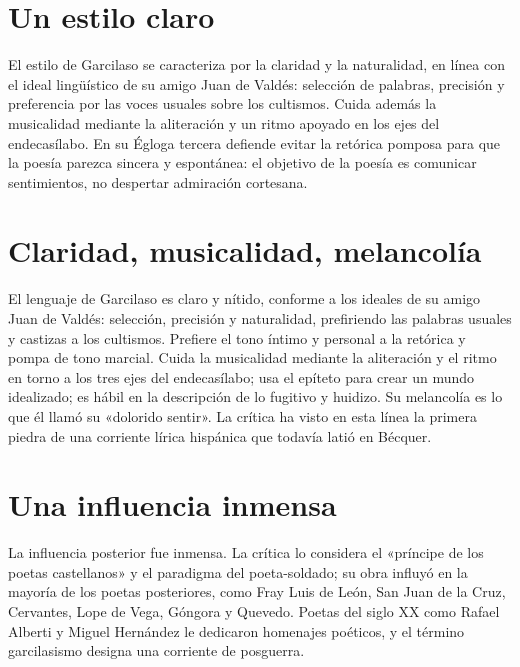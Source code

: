 \documentclass{book}
\begin{document}

\section{Un estilo claro}

El estilo de Garcilaso se caracteriza por la claridad y la naturalidad, en línea con el ideal lingüístico de su amigo Juan de Valdés: selección de palabras, precisión y preferencia por las voces usuales sobre los cultismos. Cuida además la musicalidad mediante la aliteración y un ritmo apoyado en los ejes del endecasílabo. En su Égloga tercera defiende evitar la retórica pomposa para que la poesía parezca sincera y espontánea: el objetivo de la poesía es comunicar sentimientos, no despertar admiración cortesana.


\section{Claridad, musicalidad, melancolía}

El lenguaje de Garcilaso es claro y nítido, conforme a los ideales de su amigo Juan de Valdés: selección, precisión y naturalidad, prefiriendo las palabras usuales y castizas a los cultismos. Prefiere el tono íntimo y personal a la retórica y pompa de tono marcial. Cuida la musicalidad mediante la aliteración y el ritmo en torno a los tres ejes del endecasílabo; usa el epíteto para crear un mundo idealizado; es hábil en la descripción de lo fugitivo y huidizo. Su melancolía es lo que él llamó su «dolorido sentir». La crítica ha visto en esta línea la primera piedra de una corriente lírica hispánica que todavía latió en Bécquer.


\section{Una influencia inmensa}

La influencia posterior fue inmensa. La crítica lo considera el «príncipe de los poetas castellanos» y el paradigma del poeta-soldado; su obra influyó en la mayoría de los poetas posteriores, como Fray Luis de León, San Juan de la Cruz, Cervantes, Lope de Vega, Góngora y Quevedo. Poetas del siglo XX como Rafael Alberti y Miguel Hernández le dedicaron homenajes poéticos, y el término garcilasismo designa una corriente de posguerra.
\end{document}
